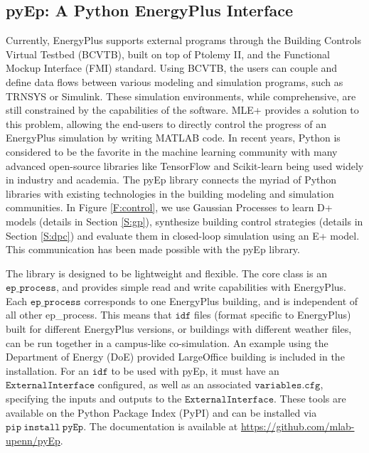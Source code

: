 \subsection{pyEp: A Python EnergyPlus Interface}

Currently, EnergyPlus supports external programs through the Building Controls Virtual Testbed (BCVTB), built on top of Ptolemy II, and the Functional Mockup Interface (FMI) standard. 
Using BCVTB, the users can couple and define data flows between various modeling and simulation programs, such as TRNSYS or Simulink. 
These simulation environments, while comprehensive, are still constrained by the capabilities of the software. 
MLE+ provides a solution to this problem, allowing the end-users to directly control the progress of an EnergyPlus simulation by writing MATLAB code. 
In recent years, Python is considered to be the favorite in the machine learning community with many advanced open-source libraries like TensorFlow \cite{Abadid} and Scikit-learn \cite{Pedregosa2011} being used widely in industry and academia.
The pyEp library connects the myriad of Python libraries with existing technologies in the building modeling and simulation communities. 
In Figure \ref{F:control}, we use Gaussian Processes to learn D+ models (details in Section \ref{S:gp}), synthesize building control strategies (details in Section \ref{S:dpc}) and evaluate them in closed-loop simulation using an E+ model. 
This communication has been made possible with the pyEp library.

The library is designed to be lightweight and flexible. 
The core class is an \(\mathtt{ep\_process}\), and provides simple read and write capabilities with EnergyPlus. 
Each \(\mathtt{ep\_process}\) corresponds to one EnergyPlus building, and is independent of all other ep\_process. 
This means that \(\mathtt{idf}\) files (format specific to EnergyPlus) built for different EnergyPlus versions, or buildings with different weather files, can be run together in a campus-like co-simulation. 
An example using the Department of Energy (DoE) provided LargeOffice building is included in the installation. 
For an \(\mathtt{idf}\) to be used with pyEp, it must have an \(\mathtt{ExternalInterface}\) configured, as well as an associated \(\mathtt{variables.cfg}\), specifying the inputs and outputs to the \(\mathtt{ExternalInterface}\).
These tools are available on the Python Package Index (PyPI) and can be installed via \(\mathtt{pip \ install \ pyEp}\). The documentation is available at \url{https://github.com/mlab-upenn/pyEp}.

